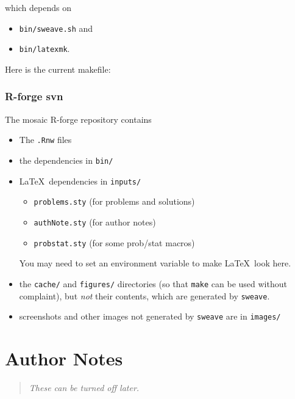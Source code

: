 \documentclass[twoside]{report}
\begin{document}
which depends on 
\begin{itemize}
\item \verb!bin/sweave.sh! and 
\item \verb!bin/latexmk!.
\end{itemize}

Here is the current makefile:


\subsection*{R-forge svn}

The mosaic R-forge repository contains
\begin{itemize}
\item 
The \verb!.Rnw! files 
\item
the dependencies in \verb!bin/!
\item
\LaTeX\ dependencies in \verb!inputs/!  
\begin{itemize}
\item \verb!problems.sty! (for problems and solutions)
\item \verb!authNote.sty! (for author notes)
\item \verb!probstat.sty! (for some prob/stat macros)
\end{itemize}
You may need to set an environment variable to make \LaTeX\ look here.
\item
the \verb!cache/! and \verb!figures/! directories (so that \verb!make! can be used 
without complaint), but
\emph{not} their contents, which are generated by \verb!sweave!.

\item
screenshots and other images not generated by \verb!sweave! are in \verb!images/!
\end{itemize}
















\appendix








%


\chapter*{Author Notes}

\begin{quote}
\emph{These can be turned off later.
}
\end{quote}

\authNotes
\end{document}
